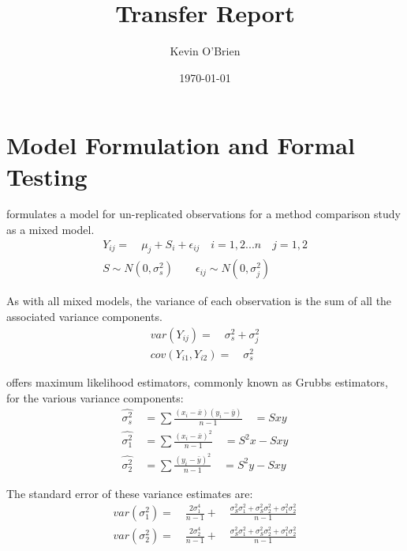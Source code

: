 \documentclass[12pt, a4paper]{article}
\begin{document}
\author{Kevin O'Brien}
\title{Transfer Report}
\date{\today}
\maketitle
\newpage

\section{Model Formulation and Formal Testing}

\citet{Kinsella} formulates a model for un-replicated observations
for a method comparison study as a mixed model.
\begin{eqnarray}
Y_{ij} =\quad \mu_{j} + S_{i} + \epsilon_{ij} \quad i=1,2...n\quad
j=1,2\\
S \sim N(0,\sigma^{2}_{s})\qquad \epsilon_{ij} \sim
N(0,\sigma^{2}_{j}) \nonumber
\end{eqnarray}

As with all mixed models, the variance of each observation is the
sum of all the associated variance components.
\begin{eqnarray}
var(Y_{ij}) =\quad \sigma^{2}_{s} + \sigma^{2}_{j} \\
cov(Y_{i1},Y_{i2})=\quad \sigma^{2}_{s} \nonumber
\end{eqnarray}

\citet{Grubbs48} offers maximum likelihood estimators, commonly
known as Grubbs estimators, for the various variance components:
\begin{eqnarray}
\hat{\sigma^{2}_{s}} \quad= \sum{\frac{(x_{i}-\bar{x})(y_{i}-\bar{y})}{n-1}}\quad=Sxy\\
\hat{\sigma^{2}_{1}} \quad= \sum{\frac{(x_{i}-\bar{x})^{2}}{n-1}} \quad=S^{2}x-Sxy \nonumber\\
\hat{\sigma^{2}_{2}} \quad=
\sum{\frac{(y_{i}-\bar{y})^{2}}{n-1}}\quad=S^{2}y-Sxy \nonumber
\nonumber
\end{eqnarray}

The standard error of these variance estimates are:
\begin{eqnarray}
var(\sigma^{2}_{1}) =\quad \frac{2\sigma^{4}_{1}}{n-1} +\quad
\frac{\sigma^2_{S}\sigma^2_{1}+\sigma^2_{S}\sigma^2_{2}+\sigma^2_{1}\sigma^2_{2}
}{n-1}\\
var(\sigma^{2}_{2}) =\quad \frac{2\sigma^{4}_{2}}{n-1} +\quad
\frac{\sigma^2_{S}\sigma^2_{1}+\sigma^2_{S}\sigma^2_{2}+\sigma^2_{1}\sigma^2_{2}
}{n-1}\nonumber
\end{eqnarray}
\end{document}
